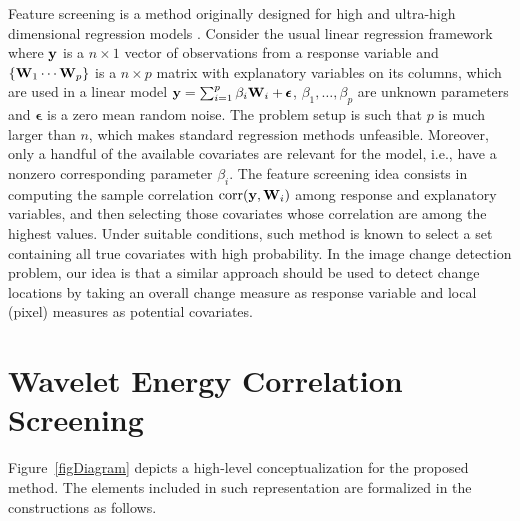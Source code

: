 \documentclass[journal]{IEEEtran}
\newcommand{\vepsilon}{\pmb{\epsilon}}
\newcommand{\vW}{{\textbf W}}
\newcommand{\vy}{{\textbf y}}
\begin{document}
Feature screening is a method originally designed for high and ultra-high dimensional regression models \cite{fan2008sure}. Consider the usual linear regression framework where $\vy$ is a $n\times 1$ vector of observations from a response variable and $\{\vW_1 \cdots \vW_p\}$ is a $n\times p$ matrix with explanatory variables on its columns, which are used in a linear model $\vy = \sum_{i=1}^{p}\beta_i\vW_i + \vepsilon$, $\beta_1,\ldots,\beta_p$ are unknown parameters and $\vepsilon$ is a zero mean random noise. The problem setup is such that $p$ is much larger than $n$, which makes standard regression methods unfeasible. Moreover, only a handful of the available covariates are relevant for the model, i.e., have a nonzero corresponding parameter $\beta_i$. The feature screening idea consists in computing the sample correlation $\mathrm{corr}(\vy,\vW_i)$ among response and explanatory variables, and then selecting those covariates whose correlation are among the highest values. Under suitable conditions, such method is known to select a set containing all true covariates with high probability. In the image change detection problem, our idea is that a similar approach should be used to detect change locations by taking an overall change measure as response variable and local (pixel) measures as potential covariates.



\section{Wavelet Energy Correlation Screening}\label{section_method}


Figure~\ref{figDiagram} depicts a high-level conceptualization for the proposed method. The elements included in such representation are formalized in the constructions as follows.
\end{document}
